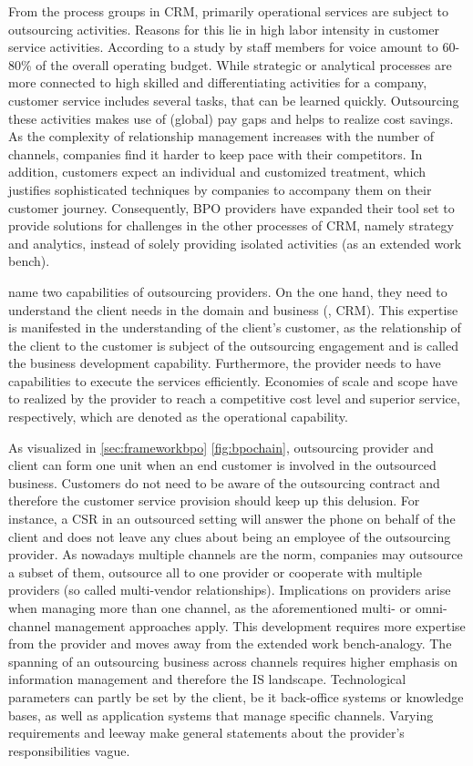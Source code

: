 		From the process groups in \acrshort{CRM}, primarily operational services are subject to outsourcing activities. Reasons for this lie in high labor intensity in customer service activities. According to a study by \cite{Aksin_2009} staff members for voice amount to 60-80\% of the overall operating budget. While strategic or analytical processes are more connected to high skilled and differentiating activities for a company, customer service includes several tasks, that can be learned quickly. Outsourcing these activities makes use of (global) pay gaps and helps to realize cost savings. As the complexity of relationship management increases with the number of channels, companies find it harder to keep pace with their competitors. In addition, customers expect an individual and customized treatment, which justifies sophisticated techniques by companies to accompany them on their customer journey. Consequently, BPO providers have expanded their tool set to provide solutions for challenges in the other processes of CRM, namely strategy and analytics, instead of solely providing isolated activities (as an extended work bench).
		
		\cite{Ramachandran2004} name two capabilities of outsourcing providers. On the one hand, they need to understand the client needs in the domain and business (\eg, CRM). This expertise is manifested in the understanding of the client's customer, as the relationship of the client to the customer is subject of the outsourcing engagement and is called the business development capability. Furthermore, the provider needs to have capabilities to execute the services efficiently. Economies of scale and scope have to realized by the provider to reach a competitive cost level and superior service, respectively, which are denoted as the operational capability.
		
		As visualized in  \ref{sec:frameworkbpo} \Fig \ref{fig:bpochain}, outsourcing provider and client can form one unit when an end customer is involved in the outsourced business. Customers do not need to be aware of the outsourcing contract and therefore the customer service provision should keep up this delusion. For instance, a \acrshort{CSR} in an outsourced setting will answer the phone on behalf of the client and does not leave any clues about being an employee of the outsourcing provider. As nowadays multiple channels are the norm, companies may outsource a subset of them, outsource all to one provider or cooperate with multiple providers (so called multi-vendor relationships). Implications on providers arise when managing more than one channel, as the aforementioned multi- or omni-channel management approaches apply. This development requires more expertise from the provider and moves away from the extended work bench-analogy. The spanning of an outsourcing business across channels requires higher emphasis on information management and therefore the \acrshort{IS} landscape. Technological parameters can partly be set by the client, be it back-office systems or knowledge bases, as well as application systems that manage specific channels. Varying requirements and leeway make general statements about the provider's responsibilities vague. 
		
